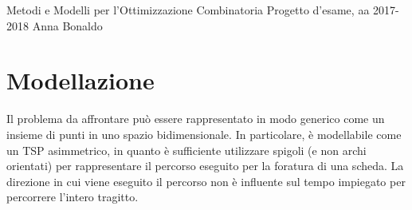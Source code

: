 
	
	\printTitle
	\newpage
	\tableofcontents
	\newpage
	Metodi e Modelli per l’Ottimizzazione Combinatoria
	Progetto d’esame, aa 2017-2018
	Anna Bonaldo
  \section{	Modellazione }
	Il problema da affrontare può essere rappresentato in modo generico come un insieme di punti in uno spazio bidimensionale. In particolare, è modellabile come un TSP asimmetrico, in quanto è sufficiente utilizzare spigoli (e non archi orientati) per rappresentare il percorso eseguito per la foratura di una scheda. La direzione in cui viene eseguito il percorso non è influente sul tempo impiegato per percorrere l’intero tragitto. 
	
